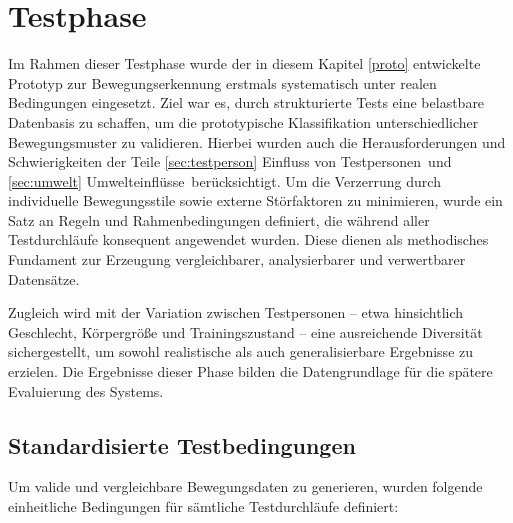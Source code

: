 \section{Testphase} 
\label{sec:testphase}
Im Rahmen dieser Testphase wurde der in diesem Kapitel \ref{proto} entwickelte Prototyp zur Bewegungserkennung erstmals systematisch unter realen Bedingungen eingesetzt. Ziel war es, durch strukturierte Tests eine belastbare Datenbasis zu schaffen, um die prototypische Klassifikation unterschiedlicher Bewegungsmuster zu validieren. Hierbei wurden auch die Herausforderungen und Schwierigkeiten der Teile \ref{sec:testperson}  \dq Einfluss von Testpersonen\dq\, und \ref{sec:umwelt} \dq Umwelteinflüsse\dq\, berücksichtigt. Um die Verzerrung durch individuelle Bewegungsstile sowie externe Störfaktoren zu minimieren, wurde ein Satz an Regeln und Rahmenbedingungen definiert, die während aller Testdurchläufe konsequent angewendet wurden. Diese dienen als methodisches Fundament zur Erzeugung vergleichbarer, analysierbarer und verwertbarer Datensätze.

Zugleich wird mit der Variation zwischen Testpersonen – etwa hinsichtlich Geschlecht, Körpergröße und Trainingszustand – eine ausreichende Diversität sichergestellt, um sowohl realistische als auch generalisierbare Ergebnisse zu erzielen. Die Ergebnisse dieser Phase bilden die Datengrundlage für die spätere Evaluierung des Systems.

\subsection{Standardisierte Testbedingungen}
\label{sec:standardregeln}

Um valide und vergleichbare Bewegungsdaten zu generieren, wurden folgende einheitliche Bedingungen für sämtliche Testdurchläufe definiert:

